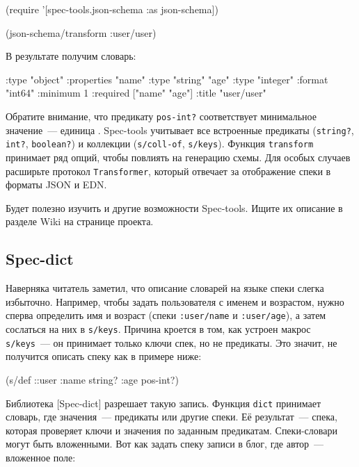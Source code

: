 \begin{english}
  \begin{clojure}
(require '[spec-tools.json-schema :as json-schema])

(json-schema/transform :user/user)
  \end{clojure}
\end{english}

В результате получим словарь:

\begin{english}
  \begin{clojure/lines}
{:type "object"
 :properties
 {"name" {:type "string"}
  "age" {:type "integer"
         :format "int64"
         :minimum 1}}
 :required ["name" "age"]
 :title "user/user"}
  \end{clojure/lines}
\end{english}

Обратите внимание, что предикату \verb|pos-int?| соответствует минимальное
значение~--- единица . Spec-tools учитывает все встроенные предикаты
(\verb|string?|, \verb|int?|, \verb|boolean?|) и коллекции (\verb|s/coll-of|,
\verb|s/keys|). Функция \verb|transform| принимает ряд опций, чтобы повлиять на
генерацию схемы. Для особых случаев расширьте протокол \verb|Transformer|,
который отвечает за отображение спеки в форматы JSON и EDN.

Будет полезно изучить и другие возможности Spec-tools. Ищите их описание в
разделе Wiki на странице проекта.

\subsection{Spec-dict}

Наверняка читатель заметил, что описание словарей на языке спеки слегка
избыточно. Например, чтобы задать пользователя с именем и возрастом, нужно
сперва определить имя и возраст (спеки \verb|:user/name| и \verb|:user/age|), а
затем сослаться на них в \verb|s/keys|. Причина кроется в том, как устроен
макрос \verb|s/keys|~--- он принимает только ключи спек, но не предикаты. Это
значит, не получится описать спеку как в примере ниже:

\begin{english}
  \begin{clojure}
(s/def ::user
  {:name string?
   :age pos-int?})
  \end{clojure}
\end{english}

Библиотека [Spec-dict]
разрешает такую запись. Функция \verb|dict| принимает словарь, где значения~--- предикаты
или другие спеки. Её результат~--- спека, которая проверяет ключи и значения
по заданным предикатам. Спеки-словари могут быть вложенными. Вот как задать
спеку записи в блог, где автор~--- вложенное поле:

